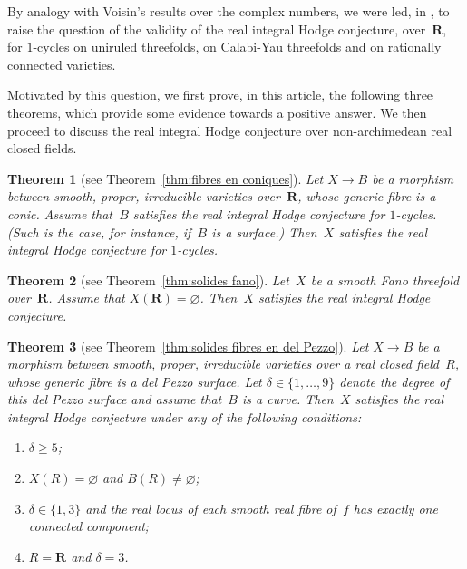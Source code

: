 \documentclass[JEP,XML,SOM,Unicode]{cedram}
\theoremstyle{plain}
\newtheorem{thm}{Theorem}[section]
\theoremstyle{definition}
\numberwithin{equation}{section}
\newcommand{\R}{{\mathbf R}}
\renewcommand{\emptyset}{\varnothing}
\begin{document}
{By analogy with Voisin's results \cite{voisinthreefolds} over the complex numbers,
we were led,
in \cite[Quest.\,\ref*{BW1-mainquestion}]{BW1},
to raise the question
of the validity of the real integral Hodge conjecture, over~$\R$,
for $1$\nobreakdash-cycles on uniruled threefolds, on Calabi-Yau threefolds and on rationally connected varieties.

Motivated by this question, we first prove, in this article, the following
three theorems, which provide some evidence towards a positive
answer. We then proceed to discuss the real integral Hodge conjecture
over non-archimedean real closed fields.

\begin{thm}[see Theorem~\ref{thm:fibres en coniques}]
\label{th:D}
Let $X\to B$ be a morphism between smooth, proper, irreducible varieties over~$\R$,
whose generic fibre is a conic.
Assume that~$B$
satisfies the real integral Hodge conjecture for $1$\nobreakdash-cycles. (Such is the case,
for instance, if~$B$ is a surface.)
Then~$X$ satisfies the real integral Hodge conjecture for $1$\nobreakdash-cycles.
\end{thm}

\begin{thm}[see Theorem~\ref{thm:solides fano}]
\label{th:E}
Let~$X$ be a smooth Fano threefold over~$\R$. Assume that $X(\R)=\emptyset$. Then~$X$ satisfies
the real integral Hodge conjecture.
\end{thm}

\begin{thm}[see Theorem~\ref{thm:solides fibres en del Pezzo}]
\label{th:F}
Let $X\to B$ be a morphism between smooth, proper, irreducible varieties
over a real closed field~$R$, whose generic fibre is a del Pezzo surface.
Let $\delta \in \{1,\dots,9\}$ denote the degree of this del Pezzo surface
and assume that~$B$ is a curve.
Then~$X$ satisfies the real integral Hodge conjecture under any of the
following conditions:\vspace*{-3pt}\enlargethispage{\baselineskip}%
\begin{enumerate}
\item $\delta\geq 5$;
\item $X(R)=\emptyset$ and $B(R)\neq\emptyset$;
\item $\delta\in\{1,3\}$ and the real locus of each smooth real fibre of~$f$ has exactly
one connected component;
\item $R=\R$ and $\delta=3$.\vspace*{-3pt}
\end{enumerate}
\end{thm}

}
\end{document}

